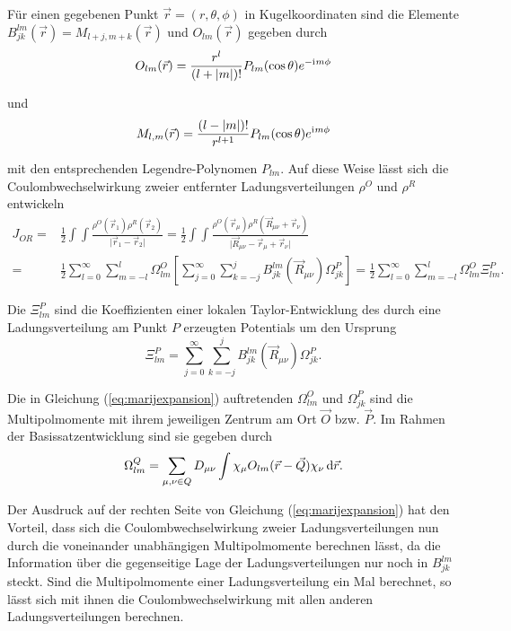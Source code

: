 	Für einen gegebenen Punkt $\vec{r}=(r,\theta,\phi)$ in Kugelkoordinaten sind die Elemente $B_{jk}^{lm}(\vec{r})=M_{l+j,m+k}(\vec{r})$ und $O_{lm}(\vec{r})$ gegeben durch
	\begin{equation}
	O_{lm}(\vec{r})=\frac{r^l}{(l+\vert m\vert)!}P_{lm}(\cos \theta)e^{-\mathrm{i}\mkern1mu m\phi}
	\end{equation}
	
	und 
	\begin{equation}
	M_{l,m}(\vec{r})=\frac{(l-\vert m\vert)!}{r^{l+1}}P_{lm}(\cos \theta)e^{\mathrm{i}\mkern1mu m\phi}
	\end{equation}
	
	mit den entsprechenden Legendre-Polynomen $P_{lm}$. Auf diese Weise lässt sich die Coulombwechselwirkung zweier entfernter Ladungsverteilungen $\rho^O$ und $\rho^R$ entwickeln
	\begin{equation}\label{eq:marijexpansion}
	\begin{aligned}
	J_{OR}=&\frac{1}{2} \int\int\frac{\rho^O(\vec{r}_1)\rho^R(\vec{r}_2)}{\vert\vec{r}_1-\vec{r}_2\vert}=\frac{1}{2}\int\int\frac{\rho^O(\vec{r}_\mu)\rho^R(\vec{R}_{\mu\nu}+\vec{r}_\nu)}{\vert\vec{R}_{\mu\nu}-\vec{r}_\mu+\vec{r}_\nu\vert}\\
	=&\frac{1}{2}\sum_{l=0}^\infty\sum_{m=-l}^l\Omega_{lm}^O\left[\sum_{j=0}^\infty\sum_{k=-j}^jB_{jk}^{lm}(\vec{R}_{\mu\nu})\Omega_{jk}^P\right]=\frac{1}{2}\sum_{l=0}^\infty\sum_{m=-l}^l\Omega_{lm}^O\Xi_{lm}^P.
	\end{aligned}
	\end{equation}
	
	Die $\Xi_{lm}^P$ sind die Koeffizienten einer lokalen Taylor-Entwicklung des durch eine Ladungsverteilung am Punkt $P$ erzeugten Potentials um den Ursprung
	\begin{equation}
	\Xi_{lm}^P=\sum_{j=0}^\infty\sum_{k=-j}^jB_{jk}^{lm}(\vec{R}_{\mu\nu})\Omega_{jk}^P.
	\end{equation}
	
	Die in Gleichung (\ref{eq:marijexpansion}) auftretenden $\Omega_{lm}^O$ und $\Omega_{jk}^P$ sind die Multipolmomente mit ihrem jeweiligen Zentrum am Ort $\vec{O}$ bzw. $\vec{P}$. Im Rahmen der Basissatzentwicklung sind sie gegeben durch
	\begin{equation}\label{eq:multipole}
	\Omega^Q_{lm}=\sum_{\mu,\nu \in Q}D_{\mu\nu}\int\chi_\mu O_{lm}(\vec{r}-\vec{Q})\chi_{\nu}\mathop{}\!\mathrm{d} \vec{r}.
	\end{equation}
	
	Der Ausdruck auf der rechten Seite von Gleichung (\ref{eq:marijexpansion}) hat den Vorteil, dass sich die Coulombwechselwirkung zweier Ladungsverteilungen nun durch die voneinander unabhängigen Multipolmomente berechnen lässt, da die Information über die gegenseitige Lage der Ladungsverteilungen nur noch in $B_{jk}^{lm}$ steckt. Sind die Multipolmomente einer Ladungsverteilung ein Mal berechnet, so lässt sich mit ihnen die Coulombwechselwirkung mit allen anderen Ladungsverteilungen berechnen.\supercite{sierka2003fast}
	 
